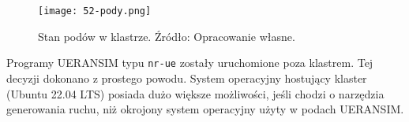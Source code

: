 \begin{figure}[!h]
    \centering \texttt{[image: 52-pody.png]}
    \caption{Stan podów w klastrze. Źródło: Opracowanie własne.}\label{fig:52-pody}
\end{figure}

Programy UERANSIM typu \texttt{nr-ue} zostały uruchomione poza klastrem. Tej decyzji dokonano z prostego powodu. System operacyjny hostujący klaster (Ubuntu 22.04 LTS) posiada dużo większe możliwości, jeśli chodzi o narzędzia generowania ruchu, niż okrojony system operacyjny użyty w podach UERANSIM.